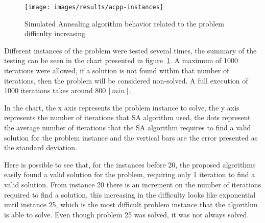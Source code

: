 \begin{figure}[htbp]
\begin{center}
\texttt{[image: images/results/acpp-instances]}
\end{center}
\caption{Simulated Annealing algorithm behavior related to the problem difficulty increasing}
\label{fig:acpp-behavior}
\end{figure}

Different instances of the problem were tested several times, the summary of the testing can be seen in the chart presented in figure~\ref{fig:acpp-behavior}. A maximum of 1000 iterations were allowed, if a solution is not found within that number of iterations, then the problem will be considered non-solved. A full execution of 1000 iterations takes around $800\,[min]$.


In the chart, the x axis represents the problem instance to solve, the y axis represents the number of iterations that SA algorithm used, the dots represent the average number of iterations that the SA algorithm requires to find a valid solution for the problem instance and the vertical bars are the error presented as the standard deviation. 

Here is possible to see that, for the instances before 20, the proposed algorithms easily found a valid solution for the problem, requiring only 1 iteration to find a valid solution. From instance 20 there is an increment on the number of iterations required to find a solution, this increasing in the difficulty looks like exponential until instance 25, which is the most difficult problem instance that the algorithm is able to solve. Even though problem 25 was solved, it was not always solved.

